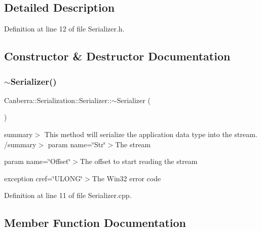 \subsection{Detailed Description}


Definition at line 12 of file Serializer.\+h.



\subsection{Constructor \& Destructor Documentation}
\mbox{\label{class_canberra_1_1_serialization_1_1_serializer_a13373231647e48d72dc5403a096882e1_a13373231647e48d72dc5403a096882e1}} 
\subsubsection{\texorpdfstring{$\sim$\+Serializer()}{~Serializer()}}
{\footnotesize\ttfamily Canberra\+::\+Serialization\+::\+Serializer\+::$\sim$\+Serializer (\begin{DoxyParamCaption}{ }\end{DoxyParamCaption})\hspace{0.3cm}{\ttfamily [virtual]}}

summary$>$ This method will serialize the application data type into the stream. /summary$>$ param name=\char`\"{}\+Str\char`\"{}$>$The stream

param name=\char`\"{}\+Offset\char`\"{}$>$The offset to start reading the stream

exception cref=\char`\"{}\+U\+L\+O\+N\+G\char`\"{}$>$The Win32 error code

Definition at line 11 of file Serializer.\+cpp.



\subsection{Member Function Documentation}
\mbox{\label{class_canberra_1_1_serialization_1_1_serializer_af6bce5a6f7a663d86cb305ef34a5c631_af6bce5a6f7a663d86cb305ef34a5c631}} 
